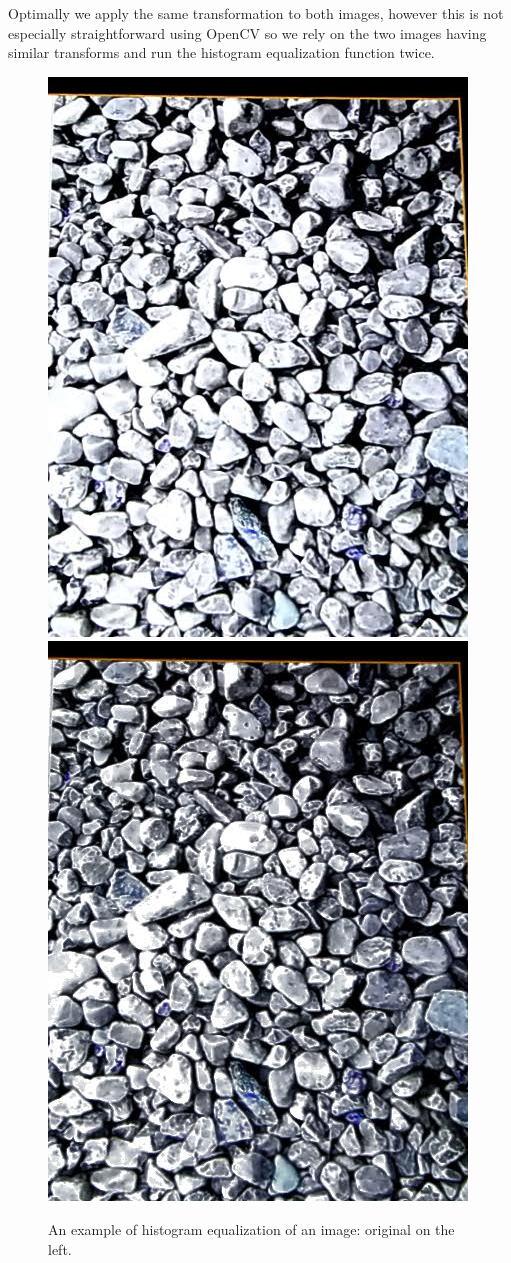 \documentclass[11pt, letterpaper]{article}
\begin{document}
Optimally we apply the same transformation to both images, however this is not especially straightforward using OpenCV so we rely on the two images having similar transforms and run the histogram equalization function twice.
\begin{figure}[hbtp]
\centering
\includegraphics[scale=0.2]{img/histeq1.jpg}
\includegraphics[scale=0.2]{img/histeq2.jpg}
\caption{An example of histogram equalization of an image: original on the left.}
\label{fig:histogram}
\end{figure}
\end{document}
